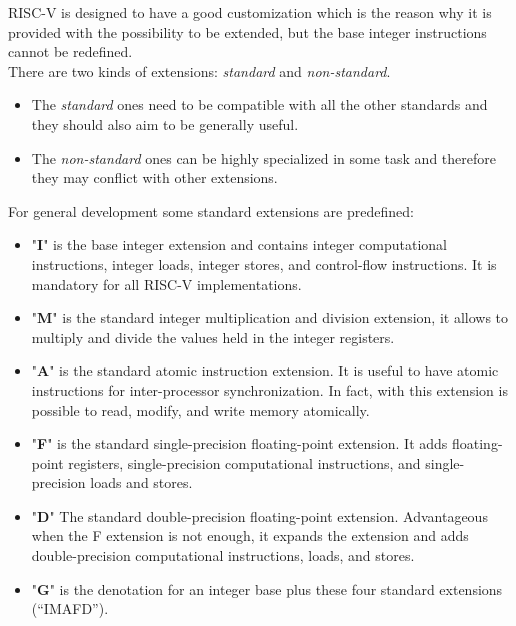 RISC-V is designed to have a good customization which is the reason why it is provided with the possibility to be extended, but the base integer instructions cannot be redeﬁned.\\
There are two kinds of extensions:
\textit{standard} and \textit{non-standard}.
\begin{itemize}
    \item The \textit{standard} ones need to be compatible with all the other standards and they should also aim to be generally useful.
    \item The \textit{non-standard} ones can be highly specialized in some task and therefore they may conflict with other extensions.
\end{itemize}

For general development some standard extensions are predefined:
\begin{itemize}
    \item "\textbf{I}" is the base integer extension and contains integer computational instructions, integer loads, integer stores, and control-ﬂow instructions. It is mandatory for all RISC-V implementations.
    
    \item "\textbf{M}" is the standard integer multiplication and division extension, it allows to multiply and divide the values held in the integer registers.
    
    \item "\textbf{A}" is the standard atomic instruction extension. It is useful to have atomic instructions for inter-processor synchronization. In fact, with this extension is possible to read, modify, and write memory atomically. 
    
    \item "\textbf{F}" is the standard single-precision ﬂoating-point extension. It adds ﬂoating-point registers, single-precision computational instructions, and single-precision loads and stores. 
    
    \item "\textbf{D}" The standard double-precision ﬂoating-point extension. Advantageous when the F extension is not enough, it expands the extension and adds double-precision computational instructions, loads, and stores.
    
    \item "\textbf{G}" is the denotation for an integer base plus these four standard extensions (“IMAFD”).
\end{itemize}


